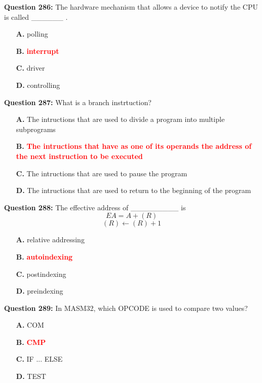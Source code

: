 \documentclass[12pt,a4paper]{article}
\begin{document}
\vspace{0.5cm}

\textbf{Question 286:} The hardware mechanism that allows a device to notify the CPU is called ______ .

\begin{itemize}
    \item[\textbf{A.}] polling
    \item[\textbf{B.}] \textcolor{red}{\textbf{interrupt}}
    \item[\textbf{C.}] driver
    \item[\textbf{D.}] controlling
\end{itemize}

\vspace{0.5cm}

\textbf{Question 287:} What is a branch instrtuction?

\begin{itemize}
    \item[\textbf{A.}] The intructions that are used to divide a program into multiple subprograms
    \item[\textbf{B.}] \textcolor{red}{\textbf{The intructions that have as one of its operands the address of the next instruction to be executed}}
    \item[\textbf{C.}] The intructions that are used to pause the program
    \item[\textbf{D.}] The intructions that are used to return to the beginning of the program
\end{itemize}

\vspace{0.5cm}

\textbf{Question 288:} The effective address of _________ is
$$EA = A + (R)$$
$$(R) \leftarrow (R) + 1$$

\begin{itemize}
    \item[\textbf{A.}] relative addressing
    \item[\textbf{B.}] \textcolor{red}{\textbf{autoindexing}}
    \item[\textbf{C.}] postindexing
    \item[\textbf{D.}] preindexing
\end{itemize}

\vspace{0.5cm}

\textbf{Question 289:} In MASM32, which OPCODE is used to compare two values?

\begin{itemize}
    \item[\textbf{A.}] COM
    \item[\textbf{B.}] \textcolor{red}{\textbf{CMP}}
    \item[\textbf{C.}] IF ... ELSE
    \item[\textbf{D.}] TEST
\end{itemize}
\end{document}
